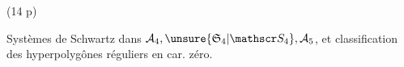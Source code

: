 (14 p)

Systèmes de Schwartz dans
$\mathcal A_4,\unsure{\mathfrak S_4|\mathscr S_4},\mathcal A_5$, et classification
des hyperpolygônes
réguliers en car. zéro.

